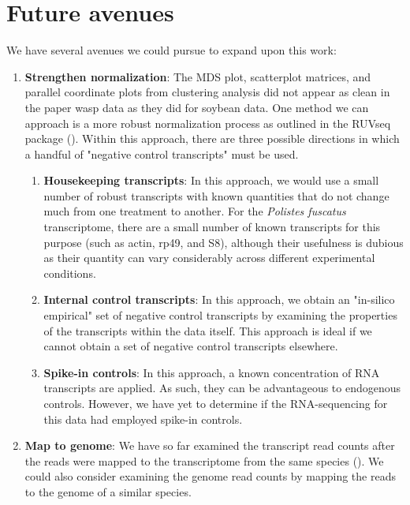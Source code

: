 \documentclass[11pt,a4paper,oldfontcommands,openany]{memoir}
\numberwithin{equation}{section} %
\begin{document}
\section{Future avenues}

We have several avenues we could pursue to expand upon this work:

\begin{enumerate}
\item \textbf{Strengthen normalization}: The MDS plot, scatterplot matrices, and parallel coordinate plots from clustering analysis did not appear as clean in the paper wasp data as they did for soybean data. One method we can approach is a more robust normalization process as outlined in the RUVseq package (\citealt{ruvseq}). Within this approach, there are three possible directions in which a handful of "negative control transcripts" must be used.

\begin{enumerate}
\item \textbf{Housekeeping transcripts}: In this approach, we would use a small number of robust transcripts with known quantities that do not change much from one treatment to another. For the \textit{Polistes fuscatus} transcriptome, there are a small number of known transcripts for this purpose (such as actin, rp49, and S8), although their usefulness is dubious as their quantity can vary considerably across different experimental conditions.
\item \textbf{Internal control transcripts}: In this approach, we obtain an "in-silico empirical" set of negative control transcripts by examining the properties of the transcripts within the data itself. This approach is ideal if we cannot obtain a set of negative control transcripts elsewhere.
\item \textbf{Spike-in controls}: In this approach, a known concentration of RNA transcripts are applied. As such, they can be advantageous to endogenous controls. However, we have yet to determine if the RNA-sequencing for this data had employed spike-in controls. 
\end{enumerate}

\item \textbf{Map to genome}: We have so far examined the transcript read counts after the reads were mapped to the transcriptome from the same species (\citealt{pw19}). We could also consider examining the genome read counts by mapping the reads to the genome of a similar species.


\end{enumerate}
\end{document}
